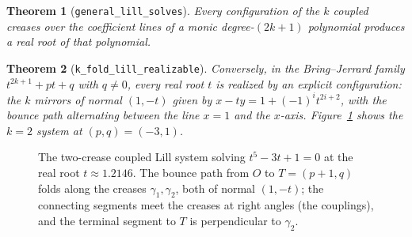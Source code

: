 \documentclass[11pt]{amsart}
\theoremstyle{plain}
\newtheorem{theorem}{Theorem}[section]
\theoremstyle{definition}
\newcommand{\code}[1]{\texttt{#1}}
\begin{document}
\begin{theorem}[\code{general\_lill\_solves}]\label{thm:lill}
Every configuration of the $k$ coupled creases over the coefficient lines of a monic degree-$(2k+1)$ polynomial produces a real root of that polynomial.
\end{theorem}

\begin{theorem}[\code{k\_fold\_lill\_realizable}]\label{thm:realizable}
Conversely, in the Bring--Jerrard family $t^{2k+1} + pt + q$ with $q \ne 0$, every real root $t$ is realized by an explicit configuration: the $k$ mirrors of normal $(1,-t)$ given by $x - ty = 1 + (-1)^i t^{2i+2}$, with the bounce path alternating between the line $x=1$ and the $x$-axis. Figure~\ref{fig:lill} shows the $k=2$ system at $(p,q) = (-3,1)$.
\end{theorem}

\begin{figure}[ht]
\centering
{}
\caption{The two-crease coupled Lill system solving $t^5 - 3t + 1 = 0$ at the real root $t \approx 1.2146$. The bounce path from $O$ to $T = (p+1,q)$ folds along the creases $\gamma_1,\gamma_2$, both of normal $(1,-t)$; the connecting segments meet the creases at right angles (the couplings), and the terminal segment to $T$ is perpendicular to $\gamma_2$.}\label{fig:lill}
\end{figure}
\end{document}
